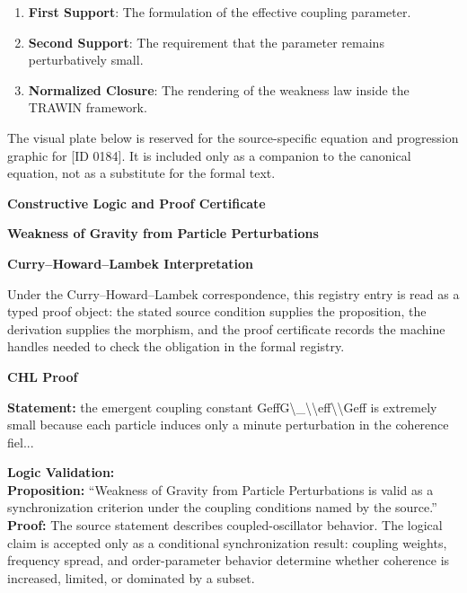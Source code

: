\begin{enumerate}[leftmargin=1.6em,itemsep=6pt,topsep=4pt]
\item \textbf{First Support}: The formulation of the effective coupling parameter.
\item \textbf{Second Support}: The requirement that the parameter remains perturbatively small.
\item \textbf{Normalized Closure}: The rendering of the weakness law inside the TRAWIN framework.
\end{enumerate}

\begingroup\footnotesize\sloppy
The visual plate below is reserved for the source-specific equation and progression graphic for [ID 0184]. It is included only as a companion to the canonical equation, not as a substitute for the formal text.
\par\endgroup
\ifTZPDarkEdition
{}
\fi

\clearpage
\begingroup\tzpsupportsetup
\noindent\textbf{\fontsize{10.8pt}{12.8pt}\selectfont [ID 0184] Constructive Logic and Proof Certificate}\par
\noindent\textbf{\fontsize{10pt}{12pt}\selectfont Weakness of Gravity from Particle Perturbations}\par
\vspace{0.45em}
\begingroup
\footnotesize
\setlength{\parskip}{0.22em}
\setlength{\parindent}{0pt}
\noindent\textbf{Curry--Howard--Lambek Interpretation}\par
Under the Curry--Howard--Lambek correspondence, this registry entry is read as a typed proof
object: the stated source condition supplies the proposition, the derivation supplies the
morphism, and the proof certificate records the machine handles needed to check the obligation
in the formal registry.

\vspace{0.45em}
\noindent\textbf{CHL Proof}\par
\textbf{Statement:} the emergent coupling constant GeffG\textbackslash{}\_\textbackslash{}\textbackslash{}eff\textbackslash{}\textbackslash{}Geff is extremely small because each
particle induces only a minute perturbation in the coherence fiel...

\textbf{Logic Validation:}\\
\textbf{Proposition:} ``Weakness of Gravity from Particle Perturbations is valid as a synchronization criterion
under the coupling conditions named by the source.''\\
\textbf{Proof:} The source statement describes coupled-oscillator behavior. The logical claim is
accepted only as a conditional synchronization result: coupling weights, frequency
spread, and order-parameter behavior determine whether coherence is increased, limited,
or dominated by a subset.

